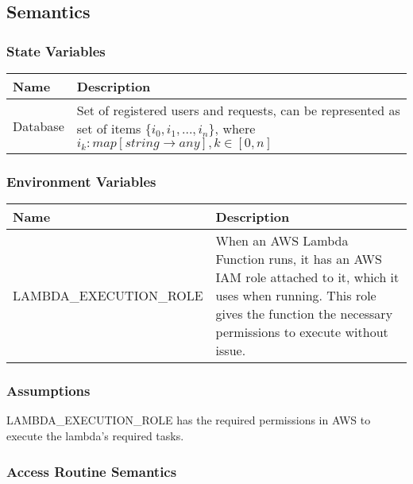 \documentclass[12pt, titlepage]{article}
\begin{document}
{  \subsection{Semantics}

  \subsubsection{State Variables}
  \begin{center}
    \begin{tabular}{p{4cm} p{12cm}}
      \hline
      \textbf{Name} & \textbf{Description} \\
      \hline
      Database & Set of registered users and requests, can be
      represented as set of
      items $\{i_0, i_1, ..., i_n\}$, where $i_k:
      map[string \rightarrow  any], k\in[0,n]$ \\
      \hline
    \end{tabular}
  \end{center}

  \subsubsection{Environment Variables}

  \begin{center}
    \begin{tabular}{p{6cm} p{10cm}}
      \hline
      \textbf{Name} & \textbf{Description} \\
      \hline
      LAMBDA\_EXECUTION\_ROLE & When an AWS Lambda Function runs, it
      has an AWS IAM role attached to it, which it uses when running.
      This role gives the function the necessary permissions to execute
      without issue. \\
      \hline
    \end{tabular}
  \end{center}

  \subsubsection{Assumptions}

  LAMBDA\_EXECUTION\_ROLE has the required permissions in AWS to
  execute the lambda's required tasks.

  \subsubsection{Access Routine Semantics}

}
\end{document}
